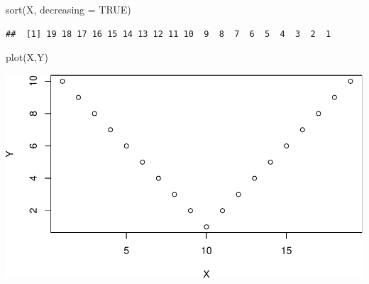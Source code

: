 \documentclass[
  english,
  man]{article}
\newenvironment{Shaded}{\begin{snugshade}}{\end{snugshade}}
\newcommand{\AttributeTok}[1]{\textcolor[rgb]{0.77,0.63,0.00}{#1}}
\newcommand{\ConstantTok}[1]{\textcolor[rgb]{0.00,0.00,0.00}{#1}}
\newcommand{\FunctionTok}[1]{\textcolor[rgb]{0.00,0.00,0.00}{#1}}
\newcommand{\NormalTok}[1]{#1}
\begin{document}
\begin{Shaded}
\begin{Highlighting}[]
\FunctionTok{sort}\NormalTok{(X, }\AttributeTok{decreasing =} \ConstantTok{TRUE}\NormalTok{)}
\end{Highlighting}
\end{Shaded}

\begin{verbatim}
##  [1] 19 18 17 16 15 14 13 12 11 10  9  8  7  6  5  4  3  2  1
\end{verbatim}

\begin{Shaded}
\begin{Highlighting}[]
\FunctionTok{plot}\NormalTok{(X,Y)}
\end{Highlighting}
\end{Shaded}

\includegraphics{CopyOflab12_files/figure-latex/unnamed-chunk-5-1.pdf}
\end{document}
